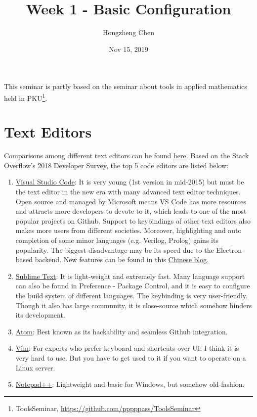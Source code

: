 \documentclass[english]{../TexTemplate/thesis}
\title{Week 1 - Basic Configuration}
\author{Hongzheng Chen}
\date{Nov 15, 2019}
\begin{document}
\maketitle

This seminar is partly based on the seminar about tools in applied mathematics held in PKU\footnote{ToolsSeminar, \url{https://github.com/pppppass/ToolsSeminar}}.

\section{Text Editors}
Comparisons among different text editors can be found \href{https://www.software.com/src/ranking-the-top-5-code-editors-2019}{here}.
Based on the Stack Overflow's 2018 Developer Survey, the top 5 code editors are listed below:
\begin{enumerate}
	\item \href{https://code.visualstudio.com/}{Visual Studio Code}: It is very young (1st version in mid-2015) but must be the text editor in the new era with many advanced text editor techniques.
	Open source and managed by Microsoft means VS Code has more resources and attracts more developers to devote to it, which leads to one of the most popular projects on Github.
	Support to keybindings of other text editors also makes more users from different societies.
	Moreover, highlighting and auto completion of some minor languages (e.g. Verilog, Prolog) gains its popularity.
	The biggest disadvantage may be its speed due to the Electron-based backend.
	New features can be found in this \href{https://zhuanlan.zhihu.com/vs-code}{Chinese blog}.
	\item \href{https://www.sublimetext.com/}{Sublime Text}: It is light-weight and extremely fast.
	Many language support can also be found in Preference - Package Control, and it is easy to configure the build system of different languages.
	The keybinding is very user-friendly.
	Though it also has large community, it is close-source which somehow hinders its development.
	\item \href{https://atom.io/}{Atom}: Best known as its hackability and seamless Github integration.
	\item \href{https://www.vim.org/}{Vim}: For experts who prefer keyboard and shortcuts over UI.
	I think it is very hard to use.
	But you have to get used to it if you want to operate on a Linux server.
	\item \href{https://notepad-plus-plus.org/}{Notepad++}: Lightweight and basic for Windows, but somehow old-fashion.
\end{enumerate}
\end{document}
